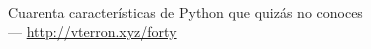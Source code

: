 {

\begin{frame}[plain]
  \vspace{6.25cm}
  \begin{TitleBox}
    {\LARGE \inserttitle} \\
    {\small Cuarenta características de Python que \textcolor{darkerred}{quizás} no conoces \\
     \insertauthor \enspace --- \thinspace \url{http://vterron.xyz/forty}}
  \end{TitleBox}
\end{frame}
}
